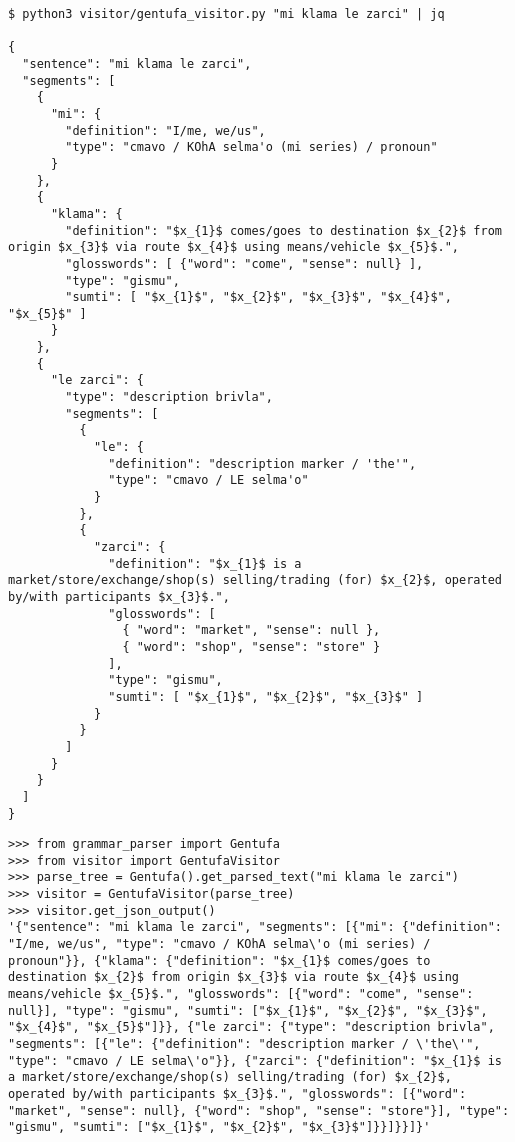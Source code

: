 \begin{lstlisting}[caption=GentufaVisitor module being used as a command-line interface tool]
$ python3 visitor/gentufa_visitor.py "mi klama le zarci" | jq

{
  "sentence": "mi klama le zarci",
  "segments": [
    {
      "mi": {
        "definition": "I/me, we/us",
        "type": "cmavo / KOhA selma'o (mi series) / pronoun"
      }
    },
    {
      "klama": {
        "definition": "$x_{1}$ comes/goes to destination $x_{2}$ from origin $x_{3}$ via route $x_{4}$ using means/vehicle $x_{5}$.",
        "glosswords": [ {"word": "come", "sense": null} ],
        "type": "gismu",
        "sumti": [ "$x_{1}$", "$x_{2}$", "$x_{3}$", "$x_{4}$", "$x_{5}$" ]
      }
    },
    {
      "le zarci": {
        "type": "description brivla",
        "segments": [
          {
            "le": {
              "definition": "description marker / 'the'",
              "type": "cmavo / LE selma'o"
            }
          },
          {
            "zarci": {
              "definition": "$x_{1}$ is a market/store/exchange/shop(s) selling/trading (for) $x_{2}$, operated by/with participants $x_{3}$.",
              "glosswords": [
                { "word": "market", "sense": null },
                { "word": "shop", "sense": "store" }
              ],
              "type": "gismu",
              "sumti": [ "$x_{1}$", "$x_{2}$", "$x_{3}$" ]
            }
          }
        ]
      }
    }
  ]
}
\end{lstlisting}

\newpage

\begin{lstlisting}[caption=GentufaVisitor class being used by a Python script]
>>> from grammar_parser import Gentufa
>>> from visitor import GentufaVisitor
>>> parse_tree = Gentufa().get_parsed_text("mi klama le zarci")
>>> visitor = GentufaVisitor(parse_tree)
>>> visitor.get_json_output()
'{"sentence": "mi klama le zarci", "segments": [{"mi": {"definition": "I/me, we/us", "type": "cmavo / KOhA selma\'o (mi series) / pronoun"}}, {"klama": {"definition": "$x_{1}$ comes/goes to destination $x_{2}$ from origin $x_{3}$ via route $x_{4}$ using means/vehicle $x_{5}$.", "glosswords": [{"word": "come", "sense": null}], "type": "gismu", "sumti": ["$x_{1}$", "$x_{2}$", "$x_{3}$", "$x_{4}$", "$x_{5}$"]}}, {"le zarci": {"type": "description brivla", "segments": [{"le": {"definition": "description marker / \'the\'", "type": "cmavo / LE selma\'o"}}, {"zarci": {"definition": "$x_{1}$ is a market/store/exchange/shop(s) selling/trading (for) $x_{2}$, operated by/with participants $x_{3}$.", "glosswords": [{"word": "market", "sense": null}, {"word": "shop", "sense": "store"}], "type": "gismu", "sumti": ["$x_{1}$", "$x_{2}$", "$x_{3}$"]}}]}}]}'
\end{lstlisting}